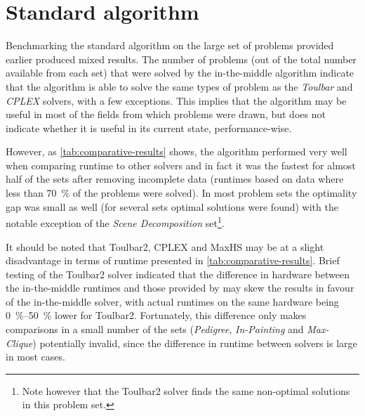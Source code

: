 \section{Standard algorithm}
Benchmarking the standard algorithm on the large set of problems provided earlier produced mixed results.
The number of problems (out of the total number available from each set) that were solved by the in-the-middle algorithm indicate that the algorithm is able to solve the same types of problem as the \emph{Toulbar} and \emph{CPLEX} solvers, with a few exceptions.
This implies that the algorithm may be useful in most of the fields from which problems were drawn, but does not indicate whether it is useful in its current state, performance-wise.

However, as \cref{tab:comparative-results} shows, the algorithm performed very well when comparing runtime to other solvers and in fact it was the fastest for almost half of the sets after removing incomplete data (runtimes based on data where less than \SI{70}{\percent} of the problems were solved).
In most problem sets the optimality gap was small as well (for several sets optimal solutions were found) with the notable exception of the \emph{Scene Decomposition} set\footnote{Note however that the Toulbar2 solver finds the same non-optimal solutions in this problem set.}.

It should be noted that Toulbar2, CPLEX and MaxHS may be at a slight disadvantage in terms of runtime presented in \cref{tab:comparative-results}.
Brief testing of the Toulbar2 solver indicated that the difference in hardware between the in-the-middle runtimes and those provided by \textcite{deGivry14} may skew the results in favour of the in-the-middle solver, with actual runtimes on the same hardware being \SIrange{0}{50}{\percent} lower for Toulbar2.
Fortunately, this difference only makes comparisons in a small number of the sets (\emph{Pedigree}, \emph{In-Painting} and \emph{Max-Clique}) potentially invalid, since the difference in runtime between solvers is large in most cases.

